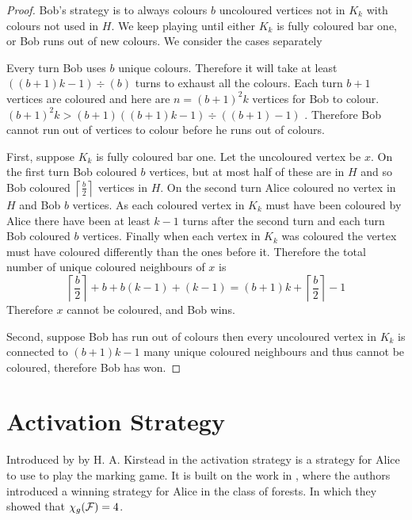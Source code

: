 \begin{proof}
Bob's strategy is to always colours $b$ uncoloured vertices not in $K_k$ with colours not used in $H$. We keep playing until either $K_k$ is fully coloured bar one, or Bob runs out of new colours. We consider the cases separately 

Every turn Bob uses $b$ unique colours. Therefore it will take at least $((b+1)k-1)\div(b)$ turns to exhaust all the colours. Each turn $b+1$ vertices are coloured and here are $n=(b+1)^2k$ vertices for Bob to colour. $(b+1)^2k > (b+1)((b+1)k-1)\div((b+1)-1)$ . Therefore Bob cannot run out of vertices to colour before he runs out of colours.

First, suppose $K_k$ is fully coloured bar one. Let the uncoloured vertex be $x$. On the first turn Bob coloured $b$ vertices, but at most half of these are in $H$ and so Bob coloured $\left\lceil \frac{b}{2}\right\rceil$ vertices in $H$. On the second turn Alice coloured no vertex in $H$ and Bob $b$ vertices. As each coloured vertex in $K_k$ must have been coloured by Alice there have been at least $k-1$ turns after the second turn and each turn Bob coloured $b$ vertices. Finally when each vertex in $K_k$ was coloured the vertex must have coloured differently than the ones before it. Therefore the total number of unique coloured neighbours of $x$ is 
%
\[\left\lceil \frac{b}{2}\right\rceil+b +b(k-1)+(k-1)=(b+1)k+\left\lceil \frac{b}{2}\right\rceil-1\]
%
Therefore $x$ cannot be coloured, and Bob wins.

Second, suppose Bob has run out of colours then every uncoloured vertex in $K_k$ is connected to $(b+1)k-1$ many unique coloured neighbours and thus cannot be coloured, therefore Bob has won.
\end{proof}

\section{Activation Strategy}

Introduced by by H. A. Kirstead in \cite{KIERSTEAD2000} the activation strategy is a strategy for Alice to use to play the marking game. It is built on the work in \cite{faKeKiTr1993}, where the authors introduced a winning strategy for Alice in the class of forests. In which they showed that $\chi_g(\mathcal{F})=4$. 

